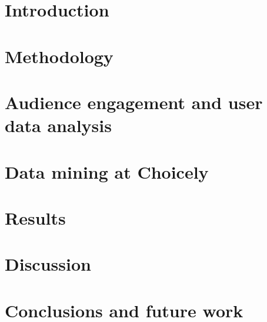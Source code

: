 \documentclass[english]{tktltiki}
\begin{document}
\mytableofcontents
	\section{Introduction}
	\label{section::introduction}
	
	\pagebreak
	
	\section{Methodology}
	\label{section::methodology}
	
	\pagebreak
	
	\section{Audience engagement and user data analysis}
	\label{section::audience-engagement-and-user-data-analysis}
	
	\pagebreak
	
	\section{Data mining at Choicely}
	\label{section::data-mining-at-choicely}
	
	\pagebreak

	\section{Results}
	\label{section::results}
	
	\pagebreak

	\section{Discussion}
	\label{section::discussion}
	
	\pagebreak

	\section{Conclusions and future work}
	\label{section::conclusions}
	
\pagebreak
\nocite{*}



\lastpage
\appendices
\pagestyle{empty}

\end{document}
